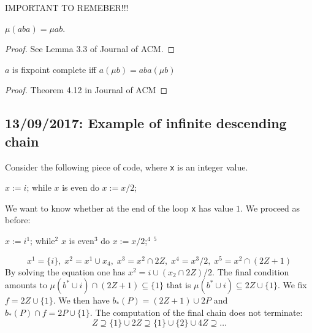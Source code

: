 \documentclass{llncs}
\begin{document}
%
%
%
%
%


IMPORTANT TO REMEBER!!! 
\begin{lemma}
$\mu(aba) = \mu ab$.
\end{lemma}
\begin{proof}
See Lemma 3.3 of Journal of ACM.
\end{proof}

\begin{proposition}
$a$ is fixpoint complete iff $a(\mu b) = aba(\mu b)$
\end{proposition}
\begin{proof}
Theorem 4.12 in Journal of ACM
\end{proof}


\subsection{13/09/2017: Example of infinite descending chain}
Consider the following piece of code, where \texttt{x} is an integer value.
\begin{codeNT}
$x := i$;  while $x$ is even  do { $x:=x/2$; }
\end{codeNT}
We want to know whether at the end of the loop \texttt{x} has value $1$.
We proceed as before:
\begin{codeNT}
$x := i$$^1$;  while$^2$ $x$ is even$^3$  do { $x:=x/2$;$^4$ }$^5$
\end{codeNT}
\begin{equation}
x^1=\{i\},  \; x^2 = x^1\cup x_4, \; x^3 = x^2 \cap 2Z, \; x^4 = x^3/2, \; x^5 = x^2 \cap (2Z+1)
\end{equation}
By solving the equation one has $x^2 = {i}\cup (x_2\cap 2Z)/2$. The final condition amounts to $\mu (b^*\cup i) \cap (2Z+1)\subseteq \{1\}$ that is $\mu (b^*\cup i)  \subseteq 2Z \cup \{1\}$. We fix $f = 2Z \cup \{1\}$.
We then have $b_*(P) =(2Z+1)\cup 2P$ and $b_*(P)\cap f = 2P \cup \{1\}$.
The computation of the final chain does not terminate:
$$Z\supseteq \{1\} \cup 2Z \supseteq \{1\} \cup \{2\} \cup 4Z \supseteq \dots$$
\end{document}
